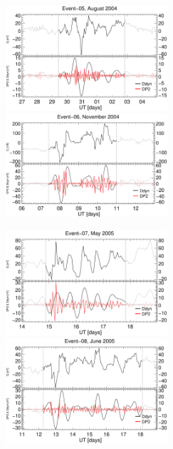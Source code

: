 \documentclass[a4paper,fleqn]{cas-dc}
\begin{document}
\begin{figure}[h!]
     \centerline{\Large \bf   
      \hspace{0.275\textwidth}  \color{black}{}
       \hspace{0.295\textwidth}  \color{black}{}
         \hfill}
      \includegraphics[width=6.0cm]{images/diono/iono_PI_V1_2004-08-27.eps}     
      \includegraphics[width=6.0cm]{images/diono/iono_PI_V1_2004-11-06.eps}
       \centerline{\Large \bf   
      \hspace{0.275\textwidth}  \color{black}{}
       \hspace{0.295\textwidth}  \color{black}{}
         \hfill}
       \includegraphics[width=6.0cm]{images/diono/iono_PI_V1_2005-05-14.eps}     
       \includegraphics[width=6.0cm]{images/diono/iono_PI_V1_2005-06-11.eps}


\end{figure}
\end{document}
